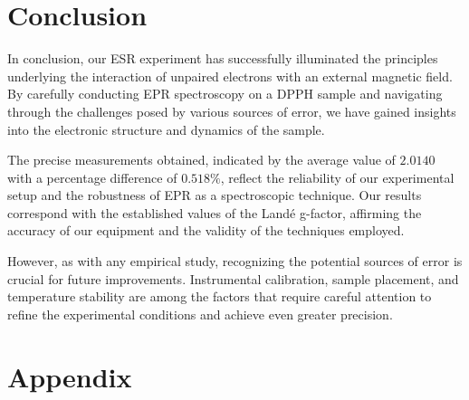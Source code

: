 \documentclass[11pt]{article}
\begin{document}
	
	\clearpage
	
	\section{Conclusion}
	
	In conclusion, our ESR experiment has successfully illuminated the principles underlying the interaction of unpaired electrons with an external magnetic field. By carefully conducting EPR spectroscopy on a DPPH sample and navigating through the challenges posed by various sources of error, we have gained insights into the electronic structure and dynamics of the sample.
	
	The precise measurements obtained, indicated by the average value of $2.0140$ with a percentage difference of $0.518\%$, reflect the reliability of our experimental setup and the robustness of EPR as a spectroscopic technique. Our results correspond with the established values of the Landé g-factor, affirming the accuracy of our equipment and the validity of the techniques employed.
	
	However, as with any empirical study, recognizing the potential sources of error is crucial for future improvements. Instrumental calibration, sample placement, and temperature stability are among the factors that require careful attention to refine the experimental conditions and achieve even greater precision.
	
	\clearpage
	
	\section{Appendix}
	
\end{document}

